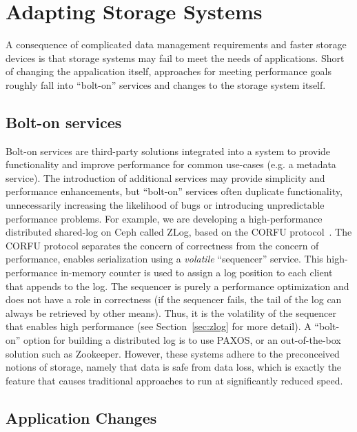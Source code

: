\documentclass[10pt,twocolumn]{article}
\begin{document}
\section{Adapting Storage Systems}

\label{problem}

A consequence of complicated data management requirements and faster storage
devices is that storage systems may fail to meet the needs of applications.
Short of changing the appalication itself, approaches for meeting performance goals roughly fall into ``bolt-on'' services and changes to the storage system itself.

\subsection{Bolt-on services}
\label{bolt-on-services}

Bolt-on services are third-party solutions integrated into a
system to provide functionality and improve performance for common use-cases
(e.g. a metadata service). The introduction of additional services may provide
simplicity and performance enhancements, but ``bolt-on'' services often
duplicate functionality, unnecessarily increasing the likelihood of bugs or
introducing unpredictable performance problems. For example, we are developing
a high-performance distributed shared-log on Ceph called ZLog, based on the
CORFU protocol~\cite{balakrishnan_corfu_2012}. The CORFU protocol separates the concern of correctness from the concern of performance, enables serialization using a \emph{volatile}
``sequencer'' service. This high-performance in-memory counter is used to assign a log
position to each client that appends to the log. The sequencer is purely a performance optimization and does not have a role in correctness (if the sequencer fails, the tail of the log can always be retrieved by other means). Thus, it is the volatility of the sequencer that enables high performance (see Section~\ref{sec:zlog} for more detail). A ``bolt-on'' option for building
a distributed log is to use PAXOS, or an out-of-the-box solution such as
Zookeeper. However, these systems adhere to the preconceived notions of
storage, namely that data is safe from data loss, which is exactly the feature
that causes traditional approaches to run at significantly reduced speed. 

\subsection{Application Changes}\label{application-changes}
\end{document}
